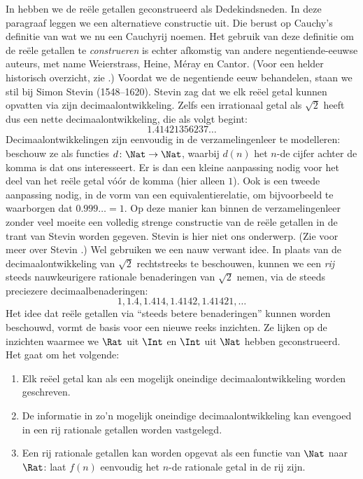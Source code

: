 \documentclass[openany]{memoir}
\begin{document}
In  hebben we de reële getallen geconstrueerd als
Dedekindsneden. In deze paragraaf leggen we een alternatieve
constructie uit. Die berust op Cauchy's definitie van wat we nu een
Cauchyrij noemen. Het gebruik van deze definitie om de reële getallen
te \emph{construeren} is echter afkomstig van andere negentiende-eeuwse
auteurs, met name Weierstrass, Heine, M\'{e}ray en Cantor. (Voor een
helder historisch overzicht, zie \citeauthor{OConnorRobertson:RN}
\citeyear{OConnorRobertson:RN}.)
Voordat we de negentiende eeuw behandelen, staan we stil bij Simon
Stevin (1548--1620). Stevin zag dat we elk reëel getal kunnen opvatten
via zijn decimaalontwikkeling. Zelfs een irrationaal getal als
$\sqrt{2}$ heeft dus een nette decimaalontwikkeling, die als volgt
begint:
\[
	1.41421356237\ldots
\] 
Decimaalontwikkelingen zijn eenvoudig in de verzamelingenleer te
modelleren: beschouw ze als functies $d \colon \Nat \to \Nat$, waarbij
$d(n)$ het $n$-de cijfer achter de komma is dat ons interesseert. Er is
dan een kleine aanpassing nodig voor het deel van het reële getal vóór
de komma (hier alleen $1$). Ook is een tweede aanpassing nodig, in de
vorm van een equivalentierelatie, om bijvoorbeeld te waarborgen dat
$0.999\ldots = 1$. Op deze manier kan binnen de verzamelingenleer zonder
veel moeite een volledig strenge constructie van de reële getallen in
de trant van Stevin worden gegeven.
Stevin is hier niet ons onderwerp. (Zie voor meer over Stevin
\citealt{KatzKatz2012}.) Wel gebruiken we een nauw verwant idee. In
plaats van de decimaalontwikkeling van $\sqrt{2}$ rechtstreeks te
beschouwen, kunnen we een \emph{rij} steeds nauwkeurigere rationale
benaderingen van $\sqrt{2}$ nemen, via de steeds preciezere
decimaalbenaderingen:
\[
1, 1.4, 1.414, 1.4142, 1.41421,\ldots
\]
Het idee dat reële getallen via ``steeds betere benaderingen'' kunnen
worden beschouwd, vormt de basis voor een nieuwe reeks inzichten. Ze
lijken op de inzichten waarmee we $\Rat$ uit $\Int$ en $\Int$ uit
$\Nat$ hebben geconstrueerd. Het gaat om het volgende:
\begin{enumerate}
	\item Elk reëel getal kan als een mogelijk oneindige
	decimaalontwikkeling worden geschreven.
	\item De informatie in zo'n mogelijk oneindige decimaalontwikkeling
	kan evengoed in een rij rationale getallen worden vastgelegd.
	\item Een rij rationale getallen kan worden opgevat als een functie
	van $\Nat$ naar $\Rat$: laat $f(n)$ eenvoudig het $n$-de rationale
	getal in de rij zijn.
\end{enumerate}
\end{document}
